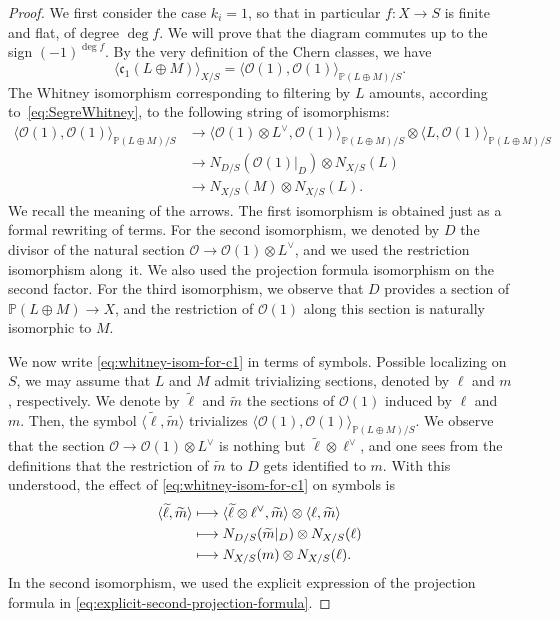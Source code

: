 \documentclass[11pt]{article}
\newcommand\mto{\mathchoice{\longmapsto}{\mapsto}{\mapsto}{\mapsto}}
\theoremstyle{plain}
\theoremstyle{definition}
\newcommand{\PBbb}{\mathbb P}
\newcommand{\Ocal}{\mathcal O}
\newcommand{\cfrak}{\mathfrak c}
\begin{document}
\begin{proof}
We first consider the case $k_i= 1$, so that in particular $f\colon X\to S$ is finite and flat, of degree $\deg f$. We will prove that the diagram commutes up to the sign $(-1)^{\deg f}$. By the very definition of the Chern classes, we have
\begin{displaymath}
\langle\cfrak_{1}(L\oplus M)\rangle_{X/S}=\langle\Ocal(1),\Ocal(1)\rangle_{\PBbb(L\oplus M)/S}.
\end{displaymath}
The Whitney isomorphism corresponding to filtering by $L$ amounts, according to~\eqref{eq:SegreWhitney}, to the following string of isomorphisms:
\begin{equation}\label{eq:whitney-isom-for-c1}
\begin{split}
\langle\Ocal(1),\Ocal(1)\rangle_{\PBbb(L\oplus M)/S}&\to \langle\Ocal(1)\otimes L^{\vee},\Ocal(1)\rangle_{\PBbb(L\oplus M)/S}\otimes \langle L,\Ocal(1)\rangle_{\PBbb(L\oplus M)/S}\\
&\to N_{D/S}(\Ocal(1)|_{D})\otimes N_{X/S}(L)\\
&\to N_{X/S}(M)\otimes N_{X/S}(L).
\end{split}
\end{equation}
We recall the meaning of the arrows. The first isomorphism is obtained just as a formal rewriting of terms. For the second isomorphism, we denoted by $D$ the divisor of the natural section $\Ocal\to\Ocal(1)\otimes L^{\vee}$, and we used the restriction isomorphism along~it. We also used the projection formula isomorphism on the second factor. For the third isomorphism, we observe that $D$ provides a section of $\PBbb(L\oplus M)\to X$, and the restriction of $\Ocal(1)$ along this section is naturally isomorphic to $M$.

We now write \eqref{eq:whitney-isom-for-c1} in terms of symbols. Possible localizing on $S$, we may assume that $L$ and $M$ admit trivializing sections, denoted by $\ell$ and $m$, respectively. We denote by $\widetilde{\ell}$ and $\widetilde{m}$ the sections of $\Ocal(1)$ induced by $\ell$ and $m$. Then, the symbol $\langle\widetilde{\ell},\widetilde{m}\rangle$ trivializes $\langle\Ocal(1),\Ocal(1)\rangle_{\PBbb(L\oplus M)/S}$. We observe that the section $\Ocal\to\Ocal(1)\otimes L^{\vee}$ is nothing but $\widetilde{\ell}\otimes\ell^{\vee}$, and one sees from the definitions that the restriction of $\widetilde{m}$ to $D$ gets identified to $m$. With this understood, the effect of \eqref{eq:whitney-isom-for-c1} on symbols is
\begin{equation}\label{eq:whitney-isom-for-c1-sections}
\begin{split}
\langle\widetilde{\ell},\widetilde{m}\rangle &\mto \langle\widetilde{\ell}\otimes\ell^{\vee},\widetilde{m}\rangle\otimes \langle \ell,\widetilde{m}\rangle\\
&\mto N_{D/S}(\widetilde{m}|_{D})\otimes N_{X/S}(\ell)\\
&\mto N_{X/S}(m)\otimes N_{X/S}(\ell).
\end{split}
\end{equation}
In the second isomorphism, we used the explicit expression of the projection formula in \eqref{eq:explicit-second-projection-formula}.


\end{proof}
\end{document}
